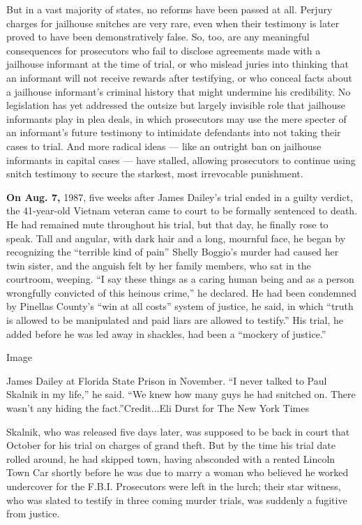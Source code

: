 But in a vast majority of states, no reforms have been passed at all.
Perjury charges for jailhouse snitches are very rare, even when their
testimony is later proved to have been demonstratively false. So, too,
are any meaningful consequences for prosecutors who fail to disclose
agreements made with a jailhouse informant at the time of trial, or who
mislead juries into thinking that an informant will not receive rewards
after testifying, or who conceal facts about a jailhouse informant's
criminal history that might undermine his credibility. No legislation
has yet addressed the outsize but largely invisible role that jailhouse
informants play in plea deals, in which prosecutors may use the mere
specter of an informant's future testimony to intimidate defendants into
not taking their cases to trial. And more radical ideas --- like an
outright ban on jailhouse informants in capital cases --- have stalled,
allowing prosecutors to continue using snitch testimony to secure the
starkest, most irrevocable punishment.

\textbf{On Aug. 7,} 1987, five weeks after James Dailey's trial ended in
a guilty verdict, the 41-year-old Vietnam veteran came to court to be
formally sentenced to death. He had remained mute throughout his trial,
but that day, he finally rose to speak. Tall and angular, with dark hair
and a long, mournful face, he began by recognizing the ``terrible kind
of pain'' Shelly Boggio's murder had caused her twin sister, and the
anguish felt by her family members, who sat in the courtroom, weeping.
``I say these things as a caring human being and as a person wrongfully
convicted of this heinous crime,'' he declared. He had been condemned by
Pinellas County's ``win at all costs'' system of justice, he said, in
which ``truth is allowed to be manipulated and paid liars are allowed to
testify.'' His trial, he added before he was led away in shackles, had
been a ``mockery of justice.''

Image

James Dailey at Florida State Prison in November. ``I never talked to
Paul Skalnik in my life,'' he said. ``We knew how many guys he had
snitched on. There wasn't any hiding the fact.''Credit...Eli Durst for
The New York Times

Skalnik, who was released five days later, was supposed to be back in
court that October for his trial on charges of grand theft. But by the
time his trial date rolled around, he had skipped town, having absconded
with a rented Lincoln Town Car shortly before he was due to marry a
woman who believed he worked undercover for the F.B.I. Prosecutors were
left in the lurch; their star witness, who was slated to testify in
three coming murder trials, was suddenly a fugitive from justice.

